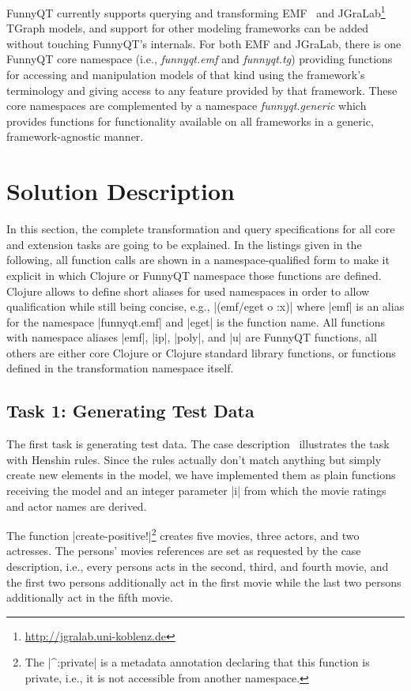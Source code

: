 \documentclass[submission]{eptcs}
\newcommand{\code}{\clojureinline}
\begin{document}
FunnyQT currently supports querying and transforming
EMF~\cite{Steinberg2008EEM} and
JGraLab\footnote{\url{http://jgralab.uni-koblenz.de}} TGraph models, and
support for other modeling frameworks can be added without touching FunnyQT's
internals.  For both EMF and JGraLab, there is one FunnyQT core namespace
(i.e., \emph{funnyqt.emf} and \emph{funnyqt.tg}) providing functions for
accessing and manipulation models of that kind using the framework's
terminology and giving access to any feature provided by that framework.  These
core namespaces are complemented by a namespace \emph{funnyqt.generic} which
provides functions for functionality available on all frameworks in a generic,
framework-agnostic manner.


\section{Solution Description}
\label{sec:solution-description}

In this section, the complete transformation and query specifications for all
core and extension tasks are going to be explained.  In the listings given in
the following, all function calls are shown in a namespace-qualified form to
make it explicit in which Clojure or FunnyQT namespace those functions are
defined.  Clojure allows to define short aliases for used namespaces in order
to allow qualification while still being concise, e.g., \code|(emf/eget o :x)|
where \code|emf| is an alias for the namespace \code|funnyqt.emf| and
\code|eget| is the function name.  All functions with namespace aliases
\code|emf|, \code|ip|, \code|poly|, and \code|u| are FunnyQT functions, all
others are either core Clojure or Clojure standard library functions, or
functions defined in the transformation namespace itself.


\subsection{Task 1: Generating Test Data}
\label{sec:task-1:generating-test-data}

The first task is generating test data.  The case
description~\cite{movies-case-desc} illustrates the task with Henshin rules.
Since the rules actually don't match anything but simply create new elements in
the model, we have implemented them as plain functions receiving the model and
an integer parameter \code|i| from which the movie ratings and actor names are
derived.

The function \code|create-positive!|\footnote{The \code|^:private| is a
  metadata annotation declaring that this function is private, i.e., it is not
  accessible from another namespace.} creates five movies, three actors, and
two actresses.  The persons' \textsf{movies} references are set as requested by
the case description, i.e., every persons acts in the second, third, and fourth
movie, and the first two persons additionally act in the first movie while the
last two persons additionally act in the fifth movie.
\end{document}
